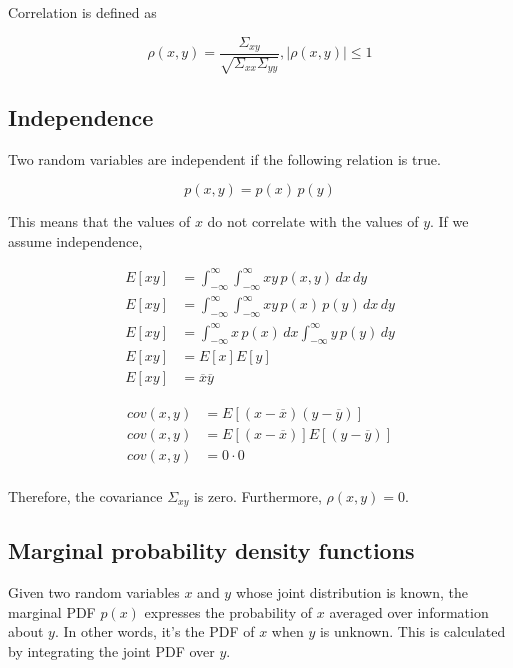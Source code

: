 Correlation is defined as

\begin{equation*}
  \rho(x, y) = \frac{\Sigma_{xy}}{\sqrt{\Sigma_{xx}\Sigma_{yy}}}, |\rho(x, y)|
    \leq 1
\end{equation*}

\subsection{Independence}

Two random variables are independent if the following relation is true.

\begin{equation*}
  p(x, y) = p(x) \,p(y)
\end{equation*}

This means that the values of $x$ do not correlate with the values of $y$. If we
assume independence,

\begin{align*}
  E[xy] &= \int_{-\infty}^\infty \int_{-\infty}^\infty xy \,p(x, y) \,dx \,dy \\
  E[xy] &= \int_{-\infty}^\infty \int_{-\infty}^\infty xy \,p(x) \,p(y) \,dx
    \,dy \\
  E[xy] &= \int_{-\infty}^\infty x \,p(x) \,dx \int_{-\infty}^\infty y \,p(y)
    \,dy \\
  E[xy] &= E[x]E[y] \\
  E[xy] &= \overline{x}\overline{y}
\end{align*}

\begin{align*}
  cov(x, y) &= E[(x - \overline{x})(y - \overline{y})] \\
  cov(x, y) &= E[(x - \overline{x})]E[(y - \overline{y})] \\
  cov(x, y) &= 0 \cdot 0 \\
\end{align*}

Therefore, the covariance $\Sigma_{xy}$ is zero. Furthermore, $\rho(x, y) = 0$.

\subsection{Marginal probability density functions}

Given two random variables $x$ and $y$ whose joint distribution is known, the
marginal PDF $p(x)$ expresses the probability of $x$ averaged over information
about $y$. In other words, it's the PDF of $x$ when $y$ is unknown. This is
calculated by integrating the joint PDF over $y$.

